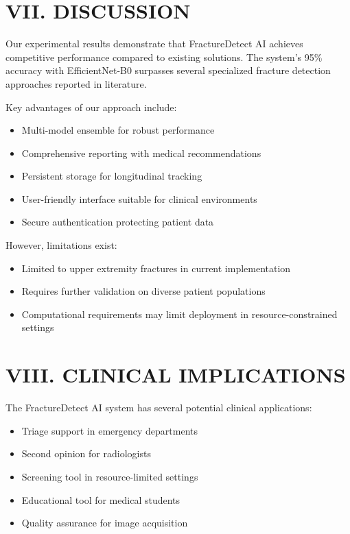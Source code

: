 \documentclass[conference]{IEEEtran}
\begin{document}
\section{VII. DISCUSSION}
\label{sec:discussion}

Our experimental results demonstrate that FractureDetect AI achieves competitive performance compared to existing solutions. The system's 95\% accuracy with EfficientNet-B0 surpasses several specialized fracture detection approaches reported in literature.

Key advantages of our approach include:
\begin{itemize}
    \item Multi-model ensemble for robust performance
    \item Comprehensive reporting with medical recommendations
    \item Persistent storage for longitudinal tracking
    \item User-friendly interface suitable for clinical environments
    \item Secure authentication protecting patient data
\end{itemize}

However, limitations exist:
\begin{itemize}
    \item Limited to upper extremity fractures in current implementation
    \item Requires further validation on diverse patient populations
    \item Computational requirements may limit deployment in resource-constrained settings
\end{itemize}

\section{VIII. CLINICAL IMPLICATIONS}
\label{sec:clinical_implications}

The FractureDetect AI system has several potential clinical applications:
\begin{itemize}
    \item Triage support in emergency departments
    \item Second opinion for radiologists
    \item Screening tool in resource-limited settings
    \item Educational tool for medical students
    \item Quality assurance for image acquisition
\end{itemize}
\end{document}
